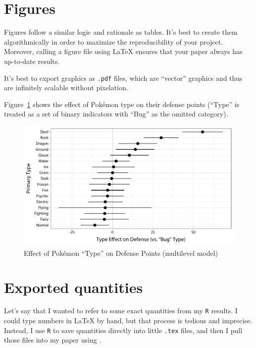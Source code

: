 \documentclass[12pt
              ]{article}
\begin{document}
\section{Figures}

Figures follow a similar logic and rationale as tables. It's best to create them algorithmically in order to maximize the reproducibility of your project. Moreover, calling a figure file using {\LaTeX} ensures that your paper always has up-to-date results.

It's best to export graphics as \texttt{.pdf} files, which are ``vector'' graphics and thus are infinitely scalable without pixelation.

Figure~\ref{fig:type-reg} shows the effect of Pok\'emon type on their defense points (``Type'' is treated as a set of binary indicators with ``Bug'' as the omitted category). 

\begin{figure}[hbt]
 \begin{center}
 \caption{Effect of Pok\'emon ``Type'' on Defense Points (multilevel model)}
 \label{fig:type-reg}
 \includegraphics[width = \textwidth]{graphics/type-intercepts.pdf}
 \end{center}
\end{figure}



\section{Exported quantities}

Let's say that I wanted to refer to some exact quantities from my \texttt{R} results. I could type numbers in {\LaTeX} by hand, but that process is tedious and imprecise. Instead, I use \texttt{R} to save quantities directly into little \texttt{.tex} files, and then I pull those files into my paper using \verb++.
\end{document}
